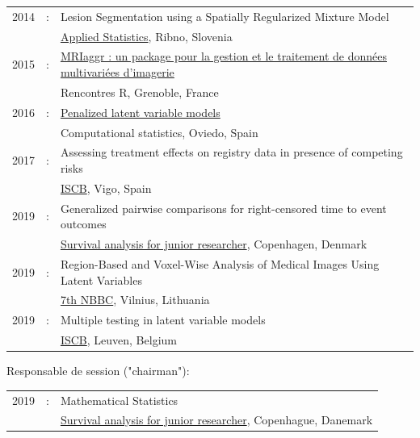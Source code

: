 \documentclass[12pt]{article}
\begin{document}
\begin{tabular}{l@{ }l@{ }l}
2014 &:& Lesion Segmentation using a Spatially Regularized Mixture Model \\
&& \href{http://conferences.nib.si/AS2014/default.htm}{Applied Statistics}, Ribno, Slovenia \\
2015 &:& \href{https://r2015-grenoble.sciencesconf.org/66037}{MRIaggr : un package pour la gestion et le traitement de données multivariées d'imagerie} \\
&& Rencontres R, Grenoble, France \\
2016 &:& \href{http://cmstatistics.org/RegistrationsV2/COMPSTAT2016/viewSubmission.php?in=440&token=29584n1s18p97n65o7p1r5n36sopq0n4}{Penalized latent variable models} \\
&& Computational statistics, Oviedo, Spain \\
2017 &:& Assessing treatment effects on registry data in presence of competing risks \\ 
&& \href{http://www.iscb2017.info/}{ISCB}, Vigo, Spain \\
2019 &:& Generalized pairwise comparisons for right-censored time to event outcomes \\
&& \href{https://publicifsv.sund.ku.dk/~safjr2019/}{Survival analysis for junior researcher}, Copenhagen, Denmark \\
2019 &:& Region-Based and Voxel-Wise Analysis of Medical Images Using Latent Variables \\
&& \href{https://events.razzby.com/nbbc19/}{7th NBBC}, Vilnius, Lithuania \\
2019 &:& Multiple testing in latent variable models \\
&& \href{https://kuleuvencongres.be/iscb40/}{ISCB}, Leuven, Belgium \\
\end{tabular}

\bigskip

Responsable de session ("chairman"):
\smallskip

\begin{tabular}{l@{ }l@{ }l}
2019 &:& Mathematical Statistics \\
&& \href{https://publicifsv.sund.ku.dk/~safjr2019/}{Survival analysis for junior researcher}, Copenhague, Danemark
\end{tabular}



\end{document}
